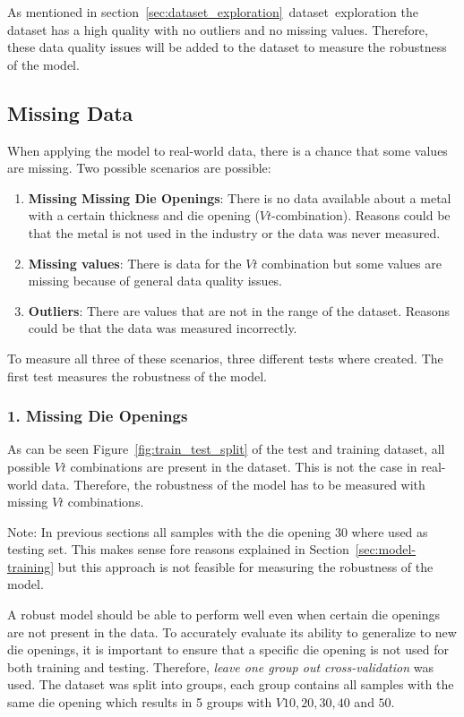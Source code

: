 As mentioned in section~\ref{sec:dataset_exploration}~dataset~exploration the dataset has a high quality with no outliers and no missing values.
Therefore, these data quality issues will be added to the dataset to measure the robustness of the model.

\subsection{Missing Data}
When applying the model to real-world data, there is a chance that some values are missing. Two possible scenarios are possible:

\begin{enumerate}
    \item \textbf{Missing Missing Die Openings}: There is no data available about a metal with a certain thickness and die opening ($Vt$-combination). Reasons could be that the metal is not used in the industry or the data was never measured.
    \item \textbf{Missing values}: There is data for the $Vt$ combination but some values are missing because of general data quality issues.
    \item \textbf{Outliers}: There are values that are not in the range of the dataset. Reasons could be that the data was measured incorrectly.
\end{enumerate}

To measure all three of these scenarios, three different tests where created. The first test measures the robustness of the model.

\subsubsection*{1. Missing Die Openings}
As can be seen Figure~\ref{fig:train_test_split} of the test and training dataset, all possible $Vt$ combinations are present in the dataset.
This is not the case in real-world data. Therefore, the robustness of the model has to be measured with missing $Vt$ combinations.

Note: In previous sections all samples with the die opening 30 where used as testing set. This makes sense fore reasons explained in Section~\ref{sec:model-training} but this approach is not feasible for measuring the robustness of the model. 

A robust model should be able to perform well even when certain die openings are not present in the data. To accurately evaluate its ability to generalize to new die openings, it is important to ensure that a specific die opening is not used for both training and testing.
Therefore, \textit{leave one group out cross-validation} was used.
The dataset was split into groups, each group contains all samples with the same die opening which results in 5 groups with $V 10, 20, 30, 40$ and $50$. 

